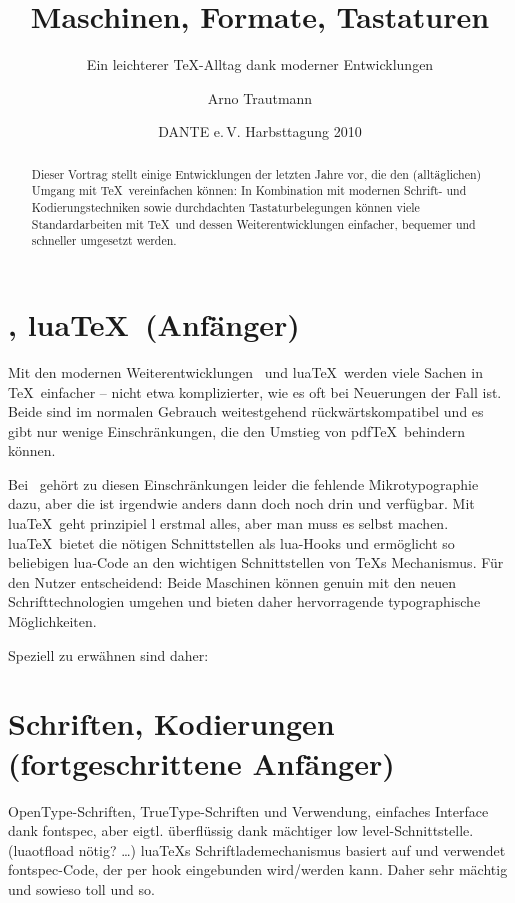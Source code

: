 \documentclass{scrartcl}
\title{Maschinen, Formate, Tastaturen}
\subtitle{Ein leichterer \TeX-Alltag dank moderner Entwicklungen}
\author{Arno Trautmann}
\date{DANTE e.\,V. Harbsttagung 2010}
\begin{document}
\maketitle
\begin{abstract}
Dieser Vortrag stellt einige Entwicklungen der letzten Jahre vor, die den (alltäglichen) Umgang mit \TeX\ vereinfachen können: In Kombination mit modernen Schrift- und Kodierungstechniken sowie durchdachten Tastaturbelegungen können viele Standardarbeiten mit \TeX\ und dessen Weiterentwicklungen einfacher, bequemer und schneller umgesetzt werden.
\end{abstract}
\tableofcontents

\section{\XeTeX, lua\TeX\ (Anfänger)}
Mit den modernen Weiterentwicklungen \XeTeX\ und lua\TeX\ werden viele Sachen in \TeX\ einfacher – nicht etwa komplizierter, wie es oft bei Neuerungen der Fall ist. Beide sind im normalen Gebrauch weitestgehend rückwärtskompatibel und es gibt nur wenige Einschränkungen, die den Umstieg von pdf\TeX\ behindern können.

Bei \XeTeX\ gehört zu diesen Einschränkungen leider die fehlende Mikrotypographie dazu, aber die ist irgendwie anders dann doch noch drin und verfügbar. Mit lua\TeX\ geht prinzipiel l erstmal alles, aber man muss es selbst machen. lua\TeX\ bietet die nötigen Schnittstellen als lua-Hooks und ermöglicht so beliebigen lua-Code an den wichtigen Schnittstellen von \TeX s Mechanismus. Für den Nutzer entscheidend: Beide Maschinen können genuin mit den neuen Schrifttechnologien umgehen und bieten daher hervorragende typographische Möglichkeiten.

Speziell zu erwähnen sind daher:

\section{Schriften, Kodierungen (fortgeschrittene Anfänger)}
OpenType-Schriften, TrueType-Schriften und Verwendung, einfaches Interface dank fontspec, aber eigtl. überflüssig dank mächtiger low level-Schnittstelle. (luaotfload nötig? …)
lua\TeX s Schriftlademechanismus basiert auf und verwendet fontspec-Code, der per hook eingebunden wird/werden kann. Daher sehr mächtig und sowieso toll und so.
\end{document}
